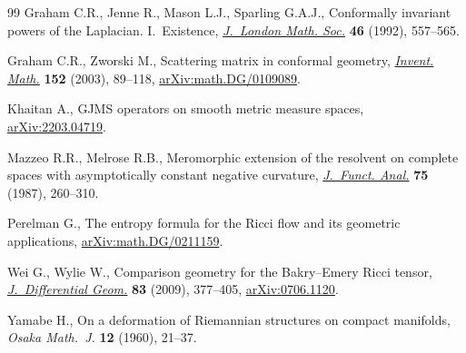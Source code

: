 \begin{thebibliography}{99}
Graham C.R., Jenne R., Mason L.J., Sparling G.A.J., Conformally invariant
 powers of the {L}aplacian. {I}.~{E}xistence, \href{https://doi.org/10.1112/jlms/s2-46.3.557}{\textit{J.~London Math. Soc.}}
 \textbf{46} (1992), 557--565.

Graham C.R., Zworski M., Scattering matrix in conformal geometry,
 \href{https://doi.org/10.1007/s00222-002-0268-1}{\textit{Invent. Math.}} \textbf{152} (2003), 89--118,
 \href{https://arxiv.org/abs/math.DG/0109089}{arXiv:math.DG/0109089}.

Khaitan A., {GJMS} operators on smooth metric measure spaces,
 \href{https://arxiv.org/abs/2203.04719}{arXiv:2203.04719}.

Mazzeo R.R., Melrose R.B., Meromorphic extension of the resolvent on complete
 spaces with asymptotically constant negative curvature, \href{https://doi.org/10.1016/0022-1236(87)90097-8}{\textit{J.~Funct.
 Anal.}} \textbf{75} (1987), 260--310.

Perelman G., The entropy formula for the {R}icci flow and its geometric
 applications, \href{https://arxiv.org/abs/math.DG/0211159}{arXiv:math.DG/0211159}.

Wei G., Wylie W., Comparison geometry for the {B}akry--{E}mery {R}icci tensor,
 \href{https://doi.org/10.4310/jdg/1261495336}{\textit{J.~Differential Geom.}} \textbf{83} (2009), 377--405,
 \href{https://arxiv.org/abs/0706.1120}{arXiv:0706.1120}.

Yamabe H., On a deformation of {R}iemannian structures on compact manifolds,
 \textit{Osaka Math.~J.} \textbf{12} (1960), 21--37.

\end{thebibliography}
